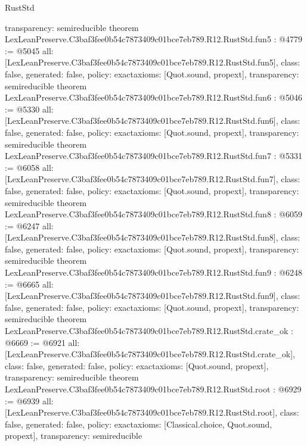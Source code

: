 \begin{lexlean}{RustStd}
\begin{coremodule}
{  transparency: semireducible
}
theorem LexLeanPreserve.C3baf3fee0b54c7873409c01bce7eb789.R12.RustStd.fun5 : @4779 := @5045 {
  all: [LexLeanPreserve.C3baf3fee0b54c7873409c01bce7eb789.R12.RustStd.fun5],
  class: false,
  generated: false,
  policy: exact{axioms: [Quot.sound, propext]},
  transparency: semireducible
}
theorem LexLeanPreserve.C3baf3fee0b54c7873409c01bce7eb789.R12.RustStd.fun6 : @5046 := @5330 {
  all: [LexLeanPreserve.C3baf3fee0b54c7873409c01bce7eb789.R12.RustStd.fun6],
  class: false,
  generated: false,
  policy: exact{axioms: [Quot.sound, propext]},
  transparency: semireducible
}
theorem LexLeanPreserve.C3baf3fee0b54c7873409c01bce7eb789.R12.RustStd.fun7 : @5331 := @6058 {
  all: [LexLeanPreserve.C3baf3fee0b54c7873409c01bce7eb789.R12.RustStd.fun7],
  class: false,
  generated: false,
  policy: exact{axioms: [Quot.sound, propext]},
  transparency: semireducible
}
theorem LexLeanPreserve.C3baf3fee0b54c7873409c01bce7eb789.R12.RustStd.fun8 : @6059 := @6247 {
  all: [LexLeanPreserve.C3baf3fee0b54c7873409c01bce7eb789.R12.RustStd.fun8],
  class: false,
  generated: false,
  policy: exact{axioms: [Quot.sound, propext]},
  transparency: semireducible
}
theorem LexLeanPreserve.C3baf3fee0b54c7873409c01bce7eb789.R12.RustStd.fun9 : @6248 := @6665 {
  all: [LexLeanPreserve.C3baf3fee0b54c7873409c01bce7eb789.R12.RustStd.fun9],
  class: false,
  generated: false,
  policy: exact{axioms: [Quot.sound, propext]},
  transparency: semireducible
}
theorem LexLeanPreserve.C3baf3fee0b54c7873409c01bce7eb789.R12.RustStd.crate_ok : @6669 := @6921 {
  all: [LexLeanPreserve.C3baf3fee0b54c7873409c01bce7eb789.R12.RustStd.crate_ok],
  class: false,
  generated: false,
  policy: exact{axioms: [Quot.sound, propext]},
  transparency: semireducible
}
theorem LexLeanPreserve.C3baf3fee0b54c7873409c01bce7eb789.R12.RustStd.root : @6929 := @6939 {
  all: [LexLeanPreserve.C3baf3fee0b54c7873409c01bce7eb789.R12.RustStd.root],
  class: false,
  generated: false,
  policy: exact{axioms: [Classical.choice, Quot.sound, propext]},
  transparency: semireducible
}


\end{coremodule}
\end{lexlean}
